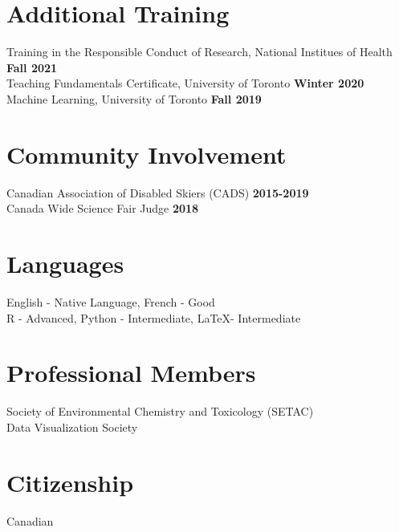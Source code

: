 \documentclass[margin,line]{res}
\begin{document}
\begin{resume}
\section{\sc Additional Training}
Training in the Responsible Conduct of Research, National Institues of Health \hfill {\bf  Fall 2021}\\
Teaching Fundamentals Certificate, University of Toronto
\hfill {\bf  Winter 2020}\\
Machine Learning, University of Toronto
\hfill {\bf  Fall 2019}

\vspace*{.1in}

\section{\sc Community Involvement}
Canadian Association of Disabled Skiers (CADS)
\hfill {\bf  2015-2019}\\
Canada Wide Science Fair Judge
\hfill {\bf  2018}

\vspace*{.1in}

\section{\sc Languages}

English - Native Language, French - Good\\
R - Advanced, Python - Intermediate, LaTeX- Intermediate

\vspace*{.1in}

\section{\sc Professional Members}
Society of Environmental Chemistry and Toxicology (SETAC)\\
Data Visualization Society\\

\vspace*{.1in}

\section{\sc Citizenship}
Canadian

\end{resume}
\end{document}
